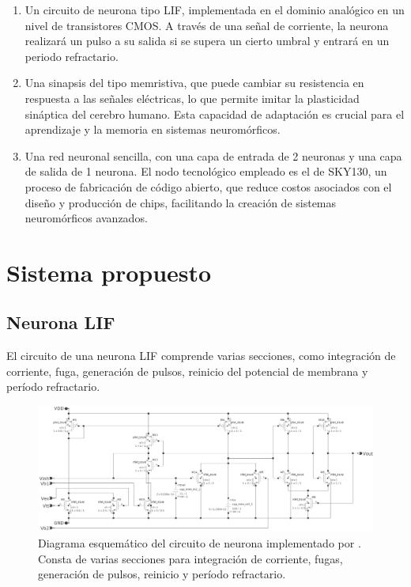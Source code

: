 \documentclass[conference]{IEEEtran}
\begin{document}
\begin{enumerate}
    \item Un circuito de neurona tipo LIF, implementada en el dominio analógico en un nivel de transistores CMOS. A través de una señal de corriente, la neurona realizará un pulso a su salida si se supera un cierto umbral y entrará en un periodo refractario.
    \item Una sinapsis del tipo memristiva, que puede cambiar su resistencia en respuesta a las señales eléctricas, lo que permite imitar la plasticidad sináptica del cerebro humano. Esta capacidad de adaptación es crucial para el aprendizaje y la memoria en sistemas neuromórficos.
    \item Una red neuronal sencilla, con una capa de entrada de 2 neuronas y una capa de salida de 1 neurona. El nodo tecnológico empleado es el de SKY130, un proceso de fabricación de código abierto, que reduce costos asociados con el diseño y producción de chips, facilitando la creación de sistemas neuromórficos avanzados.
\end{enumerate}

\section{Sistema propuesto}

\subsection{Neurona LIF}
El circuito de una neurona LIF comprende varias secciones, como integración de corriente, fuga, generación de pulsos, reinicio del potencial de membrana y período refractario.

\begin{figure}[ht]
	\centering
	\includegraphics[scale=0.14]{img/cto_neurona_LIF.png}
	\caption{Diagrama esquemático del circuito de neurona implementado por \cite{Shamsi_2018}. Consta de varias secciones para integración de corriente, fugas, generación de pulsos, reinicio y período refractario.
	\label{fig:cto_neurona_LIF}}
\end{figure}
\end{document}
